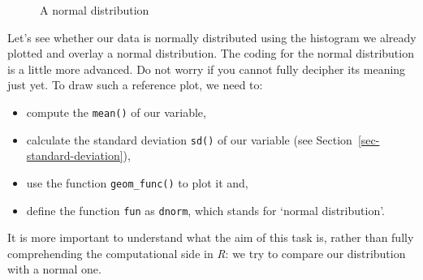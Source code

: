 \documentclass[
  letterpaper,
]{krantz}
\begin{document}
\begin{figure}


\caption{\label{fig-normal-distribution}A normal distribution}

\end{figure}%

Let's see whether our data is normally distributed using the histogram
we already plotted and overlay a normal distribution. The coding for the
normal distribution is a little more advanced. Do not worry if you
cannot fully decipher its meaning just yet. To draw such a reference
plot, we need to:

\begin{itemize}
\item
  compute the \texttt{mean()} of our variable,
\item
  calculate the standard deviation \texttt{sd()} of our variable (see
  Section~\ref{sec-standard-deviation}),
\item
  use the function \texttt{geom\_func()} to plot it and,
\item
  define the function \texttt{fun} as \texttt{dnorm}, which stands for
  `normal distribution'.
\end{itemize}

It is more important to understand what the aim of this task is, rather
than fully comprehending the computational side in \emph{R}: we try to
compare our distribution with a normal one.
\end{document}

